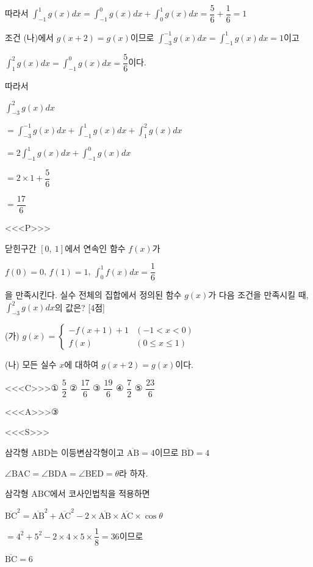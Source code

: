 \documentclass{oblivoir}
\begin{document}
따라서 $\displaystyle\int_{-1}^{1}g(x)dx$$=\displaystyle\int_{-1}^{0}g(x)dx+\displaystyle\int_{0}^{1}g(x)dx$$=\dfrac{5}{6}+\dfrac{1}{6}=1$

조건 (나)에서 $g(x+2)=g(x)$이므로  $\displaystyle\int_{-3}^{-1}g(x)dx=\displaystyle\int_{-1}^{1}g(x)dx=1$이고

$\displaystyle\int_{1}^{2}g(x)dx=\displaystyle\int_{-1}^{0}g(x)dx =\dfrac{5}{6}$이다.

따라서

$\displaystyle\int_{-3}^{2}g(x)dx$

$=\displaystyle\int_{-3}^{-1}g(x)dx+\displaystyle\int_{-1}^{1}g(x)dx+\displaystyle\int_{1}^{2}g(x)dx$

$=2\displaystyle\int_{-1}^{1}g(x)dx+\displaystyle\int_{-1}^{0}g(x)dx$

$=2\times 1+\dfrac{5}{6}$

$=\dfrac{17}{6}$

<<<P>>>

닫힌구간 $[0,\:1]$에서 연속인 함수 $f(x)$가

$f(0)=0$,  $f(1)=1$,  $\displaystyle\int_{0}^{1}f(x)dx =\dfrac{1}{6}$

을 만족시킨다. 실수 전체의 집합에서 정의된 함수 $g(x)$가 다음 조건을 만족시킬 때, $\displaystyle\int_{-3}^{2}g(x)dx$의 값은? [4점]

(가) $g(x)=\begin{cases}
-f(x+1)+1&(-1< x< 0)\\
f(x)&(0\le x\le 1)
\end{cases}$

(나) 모든 실수 $x$에 대하여 $g(x+2)=g(x)$이다.

<<<C>>>① $\dfrac{5}{2}$ ② $\dfrac{17}{6}$ ③ $\dfrac{19}{6}$ ④ $\dfrac{7}{2}$ ⑤ $\dfrac{23}{6}$

<<<A>>>③

<<<S>>>

삼각형 $\mathrm{ABD}$는 이등변삼각형이고 $\overline{\mathrm{AB}}=4$이므로 $\overline{\mathrm{BD}}=4$

$\angle\mathrm{BAC}=\angle\mathrm{BDA}=\angle\mathrm{BED}=\theta$라 하자.

삼각형 $\mathrm{ABC}$에서 코사인법칙을 적용하면

$\overline{\mathrm{BC}}^{2}$$=\overline{\mathrm{AB}}^{2}+\overline{\mathrm{AC}}^{2}-2\times\overline{\mathrm{AB}}\times\overline{\mathrm{AC}}\times\cos\theta$

$=4^{2}+5^{2}-2\times 4\times 5\times\dfrac{1}{8}$$=36$이므로

$\overline{\mathrm{BC}}=6$
\end{document}
